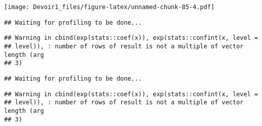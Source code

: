 \documentclass[]{article}
\newenvironment{Shaded}{\begin{snugshade}}{\end{snugshade}}
\newcommand{\KeywordTok}[1]{\textcolor[rgb]{0.13,0.29,0.53}{\textbf{#1}}}
\newcommand{\DataTypeTok}[1]{\textcolor[rgb]{0.13,0.29,0.53}{#1}}
\newcommand{\DecValTok}[1]{\textcolor[rgb]{0.00,0.00,0.81}{#1}}
\newcommand{\StringTok}[1]{\textcolor[rgb]{0.31,0.60,0.02}{#1}}
\newcommand{\OperatorTok}[1]{\textcolor[rgb]{0.81,0.36,0.00}{\textbf{#1}}}
\newcommand{\NormalTok}[1]{#1}
\begin{document}
\texttt{[image: Devoir1\_files/figure-latex/unnamed-chunk-85-4.pdf]}

\begin{Shaded}
\end{Shaded}

\begin{verbatim}
## Waiting for profiling to be done...
\end{verbatim}

\begin{verbatim}
## Warning in cbind(exp(stats::coef(x)), exp(stats::confint(x, level =
## level)), : number of rows of result is not a multiple of vector length (arg
## 3)
\end{verbatim}

\begin{verbatim}
## Waiting for profiling to be done...
\end{verbatim}

\begin{verbatim}
## Warning in cbind(exp(stats::coef(x)), exp(stats::confint(x, level =
## level)), : number of rows of result is not a multiple of vector length (arg
## 3)
\end{verbatim}
\end{document}
